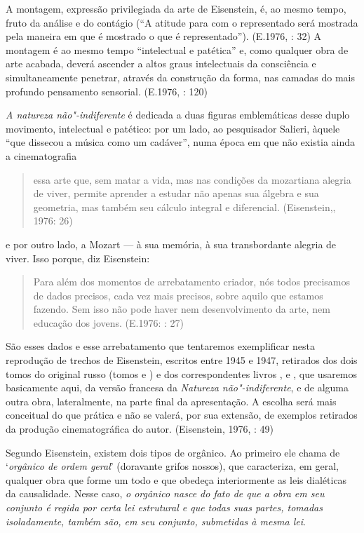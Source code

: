 A montagem, expressão privilegiada da arte de Eisenstein, é, ao mesmo
tempo, fruto da análise e do contágio (``A atitude para com o
representado será mostrada pela maneira em que é mostrado o que é
representado''). (E.1976, : 32) A montagem é ao mesmo tempo ``intelectual
e patética'' e, como qualquer obra de arte acabada, deverá ascender a
altos graus intelectuais da consciência e simultaneamente penetrar,
através da construção da forma, nas camadas do mais profundo pensamento
sensorial. (E.1976, : 120)

\emph{A natureza não"-indiferente} é dedicada a duas figuras emblemáticas
desse duplo movimento, intelectual e patético: por um lado, ao
pesquisador Salieri, àquele ``que dissecou a música como um cadáver'',
numa época em que não existia ainda a cinematografia

\begin{quote}
essa arte que, sem matar a vida, mas nas condições da mozartiana alegria
de viver, permite aprender a estudar não apenas sua álgebra e sua
geometria, mas também seu cálculo integral e diferencial. (Eisenstein,,
1976: 26)
\end{quote}

e por outro lado, a Mozart --- à sua memória, à sua transbordante alegria
de viver. Isso porque, diz Eisenstein:

\begin{quote}
Para além dos momentos de arrebatamento criador, nós todos precisamos de
dados precisos, cada vez mais precisos, sobre aquilo que estamos
fazendo. Sem isso não pode haver nem desenvolvimento da arte, nem
educação dos jovens. (E.1976: : 27)
\end{quote}

São esses dados e esse arrebatamento que tentaremos exemplificar nesta
reprodução de trechos de Eisenstein, escritos entre 1945 e 1947,
retirados dos dois tomos do original russo (tomos  e ) e dos
correspondentes livros , e , que usaremos basicamente aqui, da versão
francesa da \emph{Natureza não"-indiferente}, e de alguma outra obra,
lateralmente, na parte final da apresentação. A escolha será mais
conceitual do que prática e não se valerá, por sua extensão, de exemplos
retirados da produção cinematográfica do autor. (Eisenstein, 1976, :
49)

Segundo Eisenstein, existem dois tipos de orgânico. Ao primeiro ele
chama de `\emph{orgânico de ordem geral}' (doravante grifos nossos), que caracteriza, em geral,
qualquer obra que forme um todo e que obedeça interiormente as leis
dialéticas da causalidade. Nesse caso, \emph{o orgânico nasce do fato
de que a obra em seu conjunto é regida por certa lei estrutural e que
todas suas partes, tomadas isoladamente, também são, em seu conjunto,
submetidas à mesma lei}.

